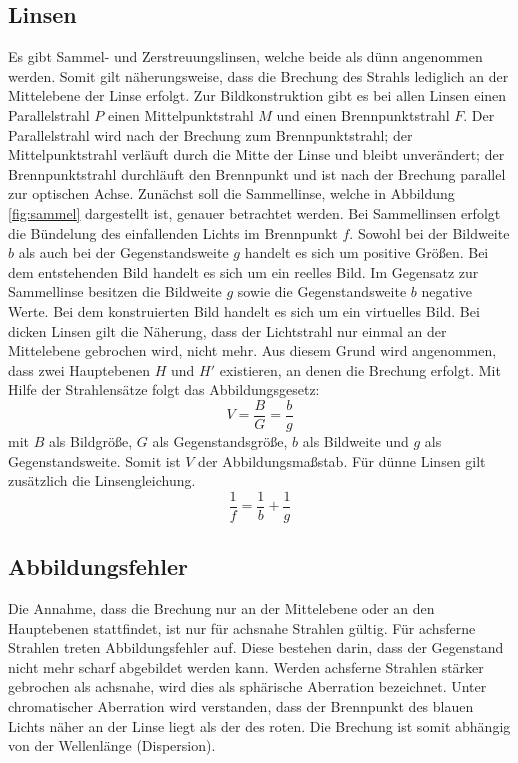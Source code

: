 \subsection{Linsen}
Es gibt Sammel- und Zerstreuungslinsen, welche beide als dünn angenommen werden. Somit gilt näherungsweise, dass die Brechung des Strahls lediglich an der Mittelebene der Linse erfolgt. Zur Bildkonstruktion gibt es bei allen Linsen einen Parallelstrahl $P$ einen Mittelpunktstrahl $M$ und einen Brennpunktstrahl $F$. Der Parallelstrahl wird nach der Brechung zum Brennpunktstrahl; der Mittelpunktstrahl verläuft durch die Mitte der Linse und bleibt unverändert; der Brennpunktstrahl durchläuft den Brennpunkt und ist nach der Brechung parallel zur optischen Achse.
Zunächst soll die Sammellinse, welche in Abbildung \ref{fig:sammel} dargestellt ist, genauer betrachtet werden.
 Bei Sammellinsen erfolgt die Bündelung des einfallenden Lichts im Brennpunkt $f$. Sowohl bei der Bildweite $b$ als auch bei der Gegenstandsweite $g$ handelt es sich um positive Größen. Bei dem entstehenden Bild handelt es sich um ein reelles Bild.
Im Gegensatz zur Sammellinse besitzen die Bildweite $g$ sowie die Gegenstandsweite $b$ negative Werte. Bei dem konstruierten Bild handelt es sich um ein virtuelles Bild.
Bei dicken Linsen gilt die Näherung, dass der Lichtstrahl nur einmal an der Mittelebene gebrochen wird, nicht mehr. Aus diesem Grund wird angenommen, dass zwei Hauptebenen $H$ und $H'$ existieren, an denen die Brechung erfolgt.
Mit Hilfe der Strahlensätze folgt das Abbildungsgesetz:
\begin{equation}
  \label{eqn:abbildung}
  V=\frac{B}{G}=\frac{b}{g}
\end{equation}
mit $B$ als Bildgröße, $G$ als Gegenstandsgröße, $b$ als Bildweite und $g$ als Gegenstandsweite. Somit ist $V$ der Abbildungsmaßstab.
Für dünne Linsen gilt zusätzlich die Linsengleichung.
\begin{equation}
  \label{eqn:linse}
  \frac{1}{f}=\frac{1}{b}+\frac{1}{g}
\end{equation}

\subsection{Abbildungsfehler}
Die Annahme, dass die Brechung nur an der Mittelebene oder an den Hauptebenen stattfindet, ist nur für achsnahe Strahlen gültig. Für achsferne Strahlen treten Abbildungsfehler auf. Diese bestehen darin, dass der Gegenstand nicht mehr scharf abgebildet werden kann. Werden achsferne Strahlen stärker gebrochen als achsnahe, wird dies als sphärische Aberration bezeichnet.
Unter chromatischer Aberration wird verstanden, dass der Brennpunkt des blauen Lichts näher an der Linse liegt als der des roten. Die Brechung ist somit abhängig von der Wellenlänge (Dispersion).

